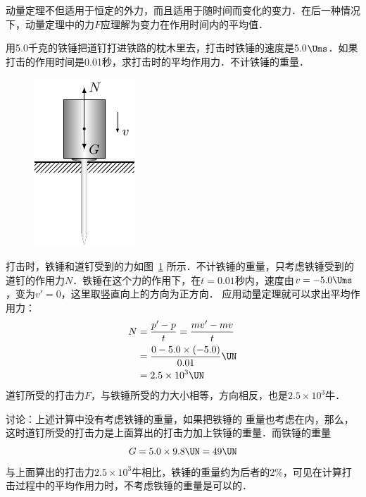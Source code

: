 动量定理不但适用于恒定的外力，而且适用于随时间而变化的变力．在后一种情况下，动量定理中的力$F$应理解为变力在作用时间内的平均值．


\begin{example}
    用5.0千克的铁锤把道钉打进铁路的枕木里去，打击时铁锤的速度是5.0$\Ums$．如果打击的作用时间是0.01秒，求打击时的平均作用力．不计铁锤的重量．
\end{example}

\begin{figure}[htbp]
    \centering
    \includegraphics{fig/A/8-1.pdf}
    \caption{}\label{fig_A_8-1}
\end{figure}

\begin{solution}
    打击时，铁锤和道钉受到的力如图~\ref{fig_A_8-1} 所示．不计铁锤的重量，只考虑铁锤受到的道钉的作用力$N$．铁锤在这个力的作用下，在$t=0.01$秒内，速度由$v=-5.0\Ums$，变为$v'=0$，这里取竖直向上的方向为正方向．
    应用动量定理就可以求出平均作用力：
\[\begin{split}
    N&=\frac{p'-p}{t}=\frac{mv'-mv}{t}\\
    &=\frac{0-5.0\times (-5.0)}{0.01}\UN\\
    &=2.5\times 10^3 \UN
\end{split}\]
道钉所受的打击力$F$，与铁锤所受的力大小相等，方向相反，也是$2.5\times 10^3$牛．
\end{solution}

讨论：上述计算中没有考虑铁锤的重量，如果把铁锤的
重量也考虑在内，那么，这时道钉所受的打击力是上面算出的打击力加上铁锤的重量．而铁锤的重量
\[G=5.0\times 9.8 \UN=49 \UN \]
与上面算出的打击力$2.5\times 10^3$牛相比，铁锤的重量约为后者的2\%，可见在计算打击过程中的平均作用力时，不考虑铁锤的重量是可以的．

